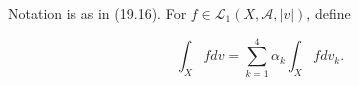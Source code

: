 Notation is as in (19.16). For $f \in \mathcal{L}_1(X, \mathcal{A}, |v|)$, define

$$\int_X f dv = \sum_{k=1}^{4} \alpha_k \int_X f dv_k.$$